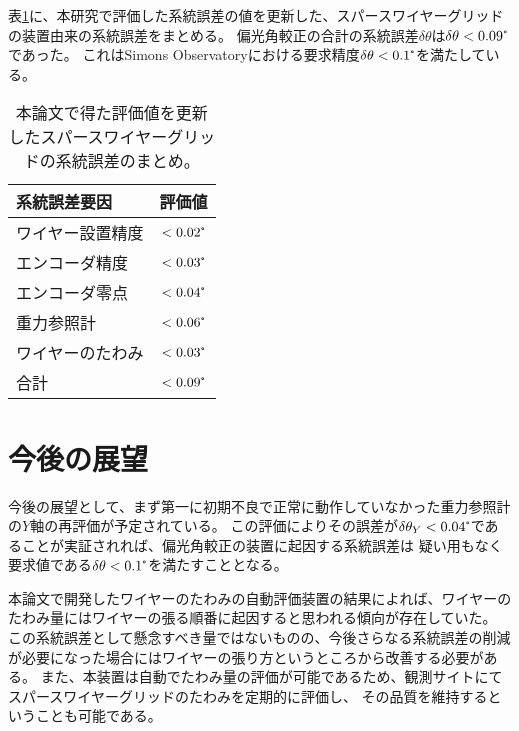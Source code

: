 \documentclass[../../main.tex]{subfiles}
\begin{document}
表\ref{tab:summary_systematic_error}に、本研究で評価した系統誤差の値を更新した、スパースワイヤーグリッドの装置由来の系統誤差をまとめる。
偏光角較正の合計の系統誤差$\delta\theta$は$\delta\theta<0.09\tcdegree$であった。
これはSimons Observatoryにおける要求精度$\delta\theta<0.1\tcdegree$を満たしている。

\begin{table}[H]
    \centering
    \caption{本論文で得た評価値を更新したスパースワイヤーグリッドの系統誤差のまとめ。}
    \begin{tabular}{lc}
        \hline\hline
        系統誤差要因 & 評価値 \\
        \hline
        ワイヤー設置精度 & $<0.02\tcdegree$ \\
        エンコーダ精度 & $<0.03\tcdegree$ \\
        エンコーダ零点 & $<0.04\tcdegree$ \\
        重力参照計\footnotemark[1]\footnotemark[2] & $<0.06\tcdegree$ \\
        ワイヤーのたわみ & $<0.03\tcdegree$ \\
        \hline
        合計 & $<0.09\tcdegree$ \\
        \hline\hline
    \end{tabular}
    \label{tab:summary_systematic_error}
\end{table}

\section{今後の展望}
今後の展望として、まず第一に初期不良で正常に動作していなかった重力参照計の$Y$軸の再評価が予定されている。
この評価によりその誤差が$\delta\theta_{Y}<0.04\tcdegree$であることが実証されれば、偏光角較正の装置に起因する系統誤差は
疑い用もなく要求値である$\delta\theta<0.1\tcdegree$を満たすこととなる。

本論文で開発したワイヤーのたわみの自動評価装置の結果によれば、ワイヤーのたわみ量にはワイヤーの張る順番に起因すると思われる傾向が存在していた。
この系統誤差として懸念すべき量ではないものの、今後さらなる系統誤差の削減が必要になった場合にはワイヤーの張り方というところから改善する必要がある。
また、本装置は自動でたわみ量の評価が可能であるため、観測サイトにてスパースワイヤーグリッドのたわみを定期的に評価し、
その品質を維持するということも可能である。
\end{document}
